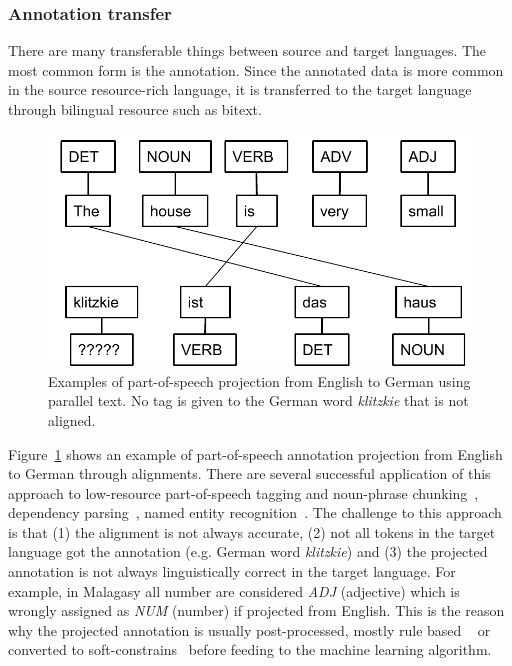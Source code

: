 \documentclass[12pt,twoside,final,hidelinks]{ltthesis}
\theoremstyle{definition}
\begin{document}
\subsubsection{Annotation transfer}
There are many transferable things between source and target languages. The most common 
form is the annotation. Since the annotated data is more common in the source resource-rich language, it is transferred to the target language through bilingual resource such as bitext.
\begin{figure}
\centering
\includegraphics[scale=0.5]{Figures/LabelProjection}
\caption{Examples of part-of-speech projection from English to German using parallel text. No tag is given to the German word \textit{klitzkie} that is not aligned.}
\label{fig:projection_example_en_de}
\end{figure}
Figure~\ref{fig:projection_example_en_de} shows an example of part-of-speech annotation projection from English to German through alignments. 
There are several successful application of this approach to low-resource part-of-speech tagging and noun-phrase chunking~\cite{YarowskyAndNgai}, dependency parsing~\cite{Hwa:2005:BPV}, named entity recognition~\cite{wang-che-manning:2013:ACL2013}.
The challenge to this approach is that (1) the alignment is not always accurate, (2) not all 
tokens in the target language got the annotation (e.g. German word \textit{klitzkie}) and (3) 
the projected annotation is not always linguistically correct in the target language. For 
example, in Malagasy all number are considered \textit{ADJ} (adjective) which is wrongly assigned as \textit{NUM} (number) if projected from English. 
This is the reason why the projected annotation is usually post-processed, mostly rule based ~\cite{Hwa:2005:BPV} or converted to soft-constrains~\cite{Das:2011,TackstromDPMN13} before feeding to the machine learning algorithm. 
\end{document}
